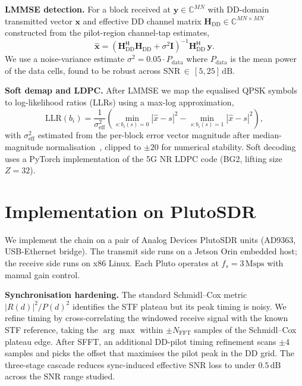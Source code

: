 \documentclass[conference,10pt]{IEEEtran}
\newcommand{\dB}{\ensuremath{\,\mathrm{dB}}}
\begin{document}
\textbf{LMMSE detection.} For a block received at $\mathbf{y} \in \mathbb{C}^{MN}$ with DD-domain transmitted vector $\mathbf{x}$ and effective DD channel matrix $\mathbf{H}_{\mathrm{DD}} \in \mathbb{C}^{MN \times MN}$ constructed from the pilot-region channel-tap estimates,
\begin{equation}
  \hat{\mathbf{x}} = (\mathbf{H}_{\mathrm{DD}}^{\mathsf{H}} \mathbf{H}_{\mathrm{DD}} + \sigma^2 \mathbf{I})^{-1}  \mathbf{H}_{\mathrm{DD}}^{\mathsf{H}} \, \mathbf{y}.
\end{equation}
We use a noise-variance estimate $\sigma^2 = 0.05 \cdot P_{\mathrm{data}}$ where $P_{\mathrm{data}}$ is the mean power of the data cells, found to be robust across SNR\,$\in\,[5, 25]\dB$.

\textbf{Soft demap and LDPC.} After LMMSE we map the equalised QPSK symbols to log-likelihood ratios (LLRs) using a max-log approximation,
\begin{equation}
  \mathrm{LLR}(b_i) = \frac{1}{\sigma_{\mathrm{eff}}^2} \!\left( \min_{s : b_i(s)=0} |\hat{x} - s|^2 - \min_{s : b_i(s)=1} |\hat{x} - s|^2 \right),
\end{equation}
with $\sigma_{\mathrm{eff}}^2$ estimated from the per-block error vector magnitude after median-magnitude normalisation~\cite{ourSDRchain}, clipped to $\pm 20$ for numerical stability. Soft decoding uses a PyTorch implementation of the 5G NR LDPC code (BG2, lifting size $Z{=}32$).

\section{Implementation on PlutoSDR}
\label{sec:impl}
We implement the chain on a pair of Analog Devices PlutoSDR units (AD9363, USB-Ethernet bridge). The transmit side runs on a Jetson Orin embedded host; the receive side runs on x86 Linux. Each Pluto operates at $f_s = 3\,\mathrm{Msps}$ with manual gain control.

\textbf{Synchronisation hardening.} The standard Schmidl--Cox metric $|R(d)|^2/P(d)^2$ identifies the STF plateau but its peak timing is noisy. We refine timing by cross-correlating the windowed receive signal with the known STF reference, taking the $\arg\max$ within $\pm N_{\mathrm{FFT}}$ samples of the Schmidl--Cox plateau edge. After SFFT, an additional DD-pilot timing refinement scans $\pm 4$ samples and picks the offset that maximises the pilot peak in the DD grid. The three-stage cascade reduces sync-induced effective SNR loss to under $0.5\dB$ across the SNR range studied.
\end{document}
